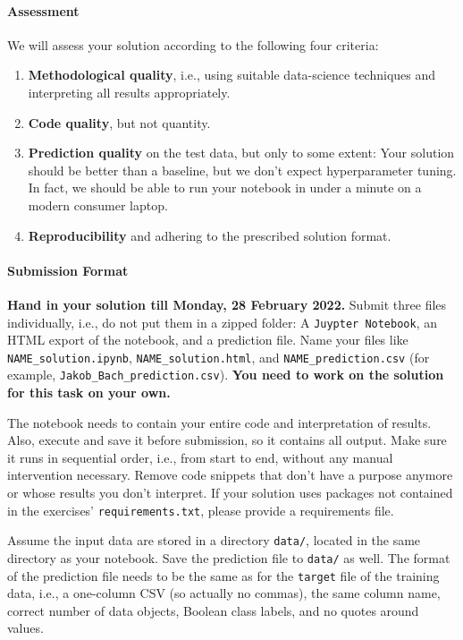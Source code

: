 \documentclass[12pt]{article}
\newcommand{\code}[1]{\textcolor{kitgreen}{\texttt{#1}}}
\begin{document}
\paragraph{Assessment}

We will assess your solution according to the following four criteria:

\begin{enumerate}[left=0pt, topsep=0pt, noitemsep]
	\item \textbf{Methodological quality}, i.e., using suitable data-science techniques and interpreting all results appropriately.
	\item \textbf{Code quality}, but not quantity.
	\item \textbf{Prediction quality} on the test data, but only to some extent:
	Your solution should be better than a baseline, but we don't expect hyperparameter tuning.
	In fact, we should be able to run your notebook in under a minute on a modern consumer laptop.
	\item \textbf{Reproducibility} and adhering to the prescribed solution format.
\end{enumerate}

\paragraph{Submission Format}

\textbf{Hand in your solution till Monday, 28 February 2022.}
Submit three files individually, i.e., do not put them in a zipped folder:
A \code{Juypter Notebook}, an HTML export of the notebook, and a prediction file.
Name your files like \code{NAME\_solution.ipynb}, \code{NAME\_solution.html}, and \code{NAME\_prediction.csv}
(for example, \code{Jakob\_Bach\_prediction.csv}).
\textbf{You need to work on the solution for this task on your own.}

The notebook needs to contain your entire code and interpretation of results.
Also, execute and save it before submission, so it contains all output.
Make sure it runs in sequential order, i.e., from start to end, without any manual intervention necessary.
Remove code snippets that don't have a purpose anymore or whose results you don't interpret.
If your solution uses packages not contained in the exercises' \code{requirements.txt}, please provide a requirements file.

Assume the input data are stored in a directory \code{data/}, located in the same directory as your notebook.
Save the prediction file to \code{data/} as well.
The format of the prediction file needs to be the same as for the \code{target} file of the training data,
i.e., a one-column CSV (so actually no commas), the same column name, correct number of data objects, Boolean class labels, and no quotes around values.
\end{document}

